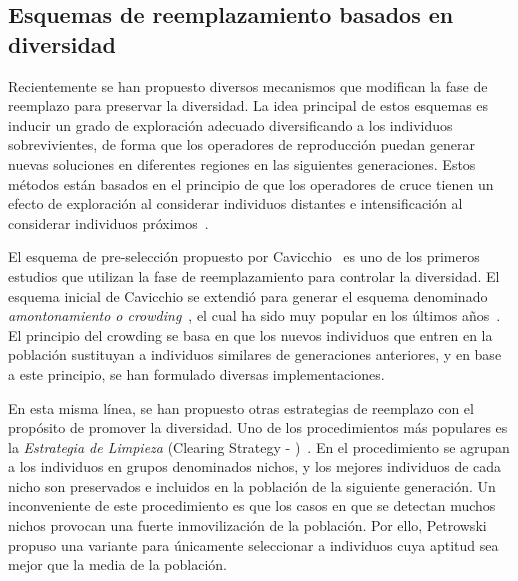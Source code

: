 \subsection{Esquemas de reemplazamiento basados en diversidad}

Recientemente se han propuesto diversos mecanismos que modifican la fase de reemplazo para preservar la diversidad.
%
La idea principal de estos esquemas es inducir un grado de exploración adecuado diversificando a los individuos sobrevivientes,
de forma que los operadores de reproducción puedan generar nuevas soluciones en diferentes regiones en las siguientes generaciones.
%
Estos métodos están basados en el principio de que los operadores de cruce tienen un efecto de exploración al 
considerar individuos distantes e intensificación al considerar individuos próximos~\cite{eiben1998evolutionary}.

El esquema de pre-selección propuesto por Cavicchio~\cite{grefenstette1986optimization} es uno de los primeros estudios que utilizan 
la fase de reemplazamiento para controlar la diversidad.
%
El esquema inicial de Cavicchio se extendió para generar el esquema denominado \textit{amontonamiento o crowding}~\cite{de1975analysis}, el cual ha sido muy popular 
en los últimos años~\cite{mahfoud1992crowding, mengshoel2014adaptive}.
%
El principio del crowding se basa en que los nuevos individuos que entren en la población sustituyan a individuos similares de generaciones anteriores, y en base
a este principio, se han formulado diversas implementaciones.

En esta misma línea, se han propuesto otras estrategias de reemplazo con el propósito de promover la diversidad.
%
Uno de los procedimientos más populares es la \textit{Estrategia de Limpieza} (Clearing Strategy - \CLR{})~\cite{lozano2008replacement}.
%
En el procedimiento \CLR{} se agrupan a los individuos en grupos denominados nichos, y los mejores individuos de cada nicho son preservados e incluidos 
en la población de la siguiente generación.
%
Un inconveniente de este procedimiento es que los casos en que se detectan muchos nichos provocan una fuerte inmovilización de la población.
%
Por ello, Petrowski~\cite{petrowski1996clearing} propuso una variante para únicamente seleccionar a individuos cuya aptitud sea mejor que la media de la población.


